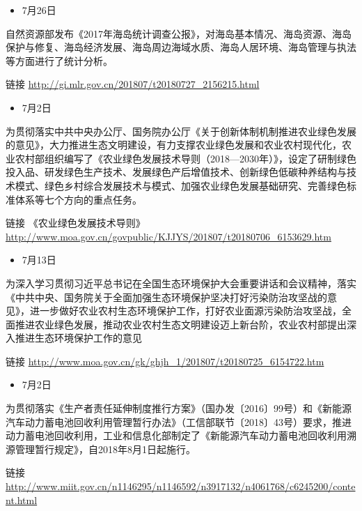 \documentclass[
]{book}
\providecommand{\tightlist}{%
  \setlength{\itemsep}{0pt}\setlength{\parskip}{0pt}}
\begin{document}
\begin{itemize}
\tightlist
\item
  7月26日
\end{itemize}

自然资源部发布《2017年海岛统计调查公报》，对海岛基本情况、海岛资源、海岛保护与修复、海岛经济发展、海岛周边海域水质、海岛人居环境、海岛管理与执法等方面进行了统计分析。

链接 \url{http://gi.mlr.gov.cn/201807/t20180727_2156215.html}

\begin{itemize}
\tightlist
\item
  7月2日
\end{itemize}

为贯彻落实中共中央办公厅、国务院办公厅《关于创新体制机制推进农业绿色发展的意见》，大力推进生态文明建设，有力支撑农业绿色发展和农业农村现代化，农业农村部组织编写了《农业绿色发展技术导则（2018---2030年）》，设定了研制绿色投入品、研发绿色生产技术、发展绿色产后增值技术、创新绿色低碳种养结构与技术模式、绿色乡村综合发展技术与模式、加强农业绿色发展基础研究、完善绿色标准体系等七个方向的重点任务。

链接 《农业绿色发展技术导则》\url{http://www.moa.gov.cn/govpublic/KJJYS/201807/t20180706_6153629.htm}

\begin{itemize}
\tightlist
\item
  7月13日
\end{itemize}

为深入学习贯彻习近平总书记在全国生态环境保护大会重要讲话和会议精神，落实《中共中央、国务院关于全面加强生态环境保护坚决打好污染防治攻坚战的意见》，进一步做好农业农村生态环境保护工作，打好农业面源污染防治攻坚战，全面推进农业绿色发展，推动农业农村生态文明建设迈上新台阶，农业农村部提出深入推进生态环境保护工作的意见

链接 \url{http://www.moa.gov.cn/gk/ghjh_1/201807/t20180725_6154722.htm}

\begin{itemize}
\tightlist
\item
  7月2日
\end{itemize}

为贯彻落实《生产者责任延伸制度推行方案》（国办发〔2016〕99号）和《新能源汽车动力蓄电池回收利用管理暂行办法》（工信部联节〔2018〕43号）要求，推进动力蓄电池回收利用，工业和信息化部制定了《新能源汽车动力蓄电池回收利用溯源管理暂行规定》，自2018年8月1日起施行。

链接 \url{http://www.miit.gov.cn/n1146295/n1146592/n3917132/n4061768/c6245200/content.html}
\end{document}
